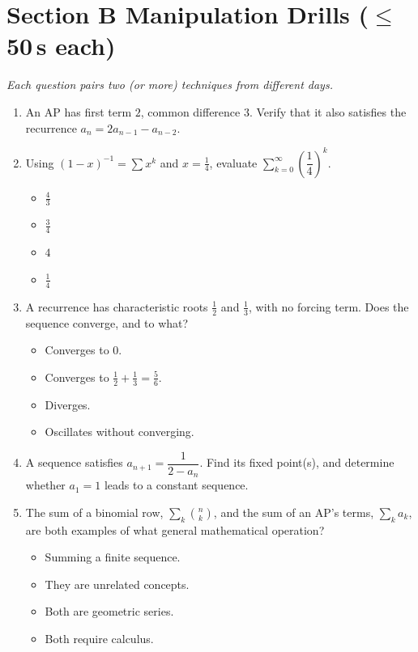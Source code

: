 \documentclass[11pt,a4paper]{article}
\begin{document}
\section*{Section B \quad Manipulation Drills \hfill{\normalfont\small($\leq$50\,s each)}}

\noindent\textit{Each question pairs two (or more) techniques from different days.}

\begin{enumerate}

\item An AP has first term $2$, common difference $3$. Verify that it also satisfies the recurrence $a_n=2a_{n-1}-a_{n-2}$.

\item Using $(1-x)^{-1}=\sum x^k$ and $x=\tfrac14$, evaluate $\displaystyle\sum_{k=0}^\infty\left(\dfrac14\right)^k$.
\begin{itemize}
\item[A)] $\tfrac43$
\item[B)] $\tfrac34$
\item[C)] $4$
\item[D)] $\tfrac14$
\end{itemize}

\item A recurrence has characteristic roots $\tfrac12$ and $\tfrac13$, with no forcing term. Does the sequence converge, and to what?
\begin{itemize}
\item[A)] Converges to $0$.
\item[B)] Converges to $\tfrac12+\tfrac13=\tfrac56$.
\item[C)] Diverges.
\item[D)] Oscillates without converging.
\end{itemize}

\item A sequence satisfies $a_{n+1}=\dfrac1{2-a_n}$. Find its fixed point(s), and determine whether $a_1=1$ leads to a constant sequence.

\item The sum of a binomial row, $\sum_k\binom nk$, and the sum of an AP's terms, $\sum_k a_k$, are both examples of what general mathematical operation?
\begin{itemize}
\item[A)] Summing a finite sequence.
\item[B)] They are unrelated concepts.
\item[C)] Both are geometric series.
\item[D)] Both require calculus.
\end{itemize}


\end{enumerate}
\end{document}
